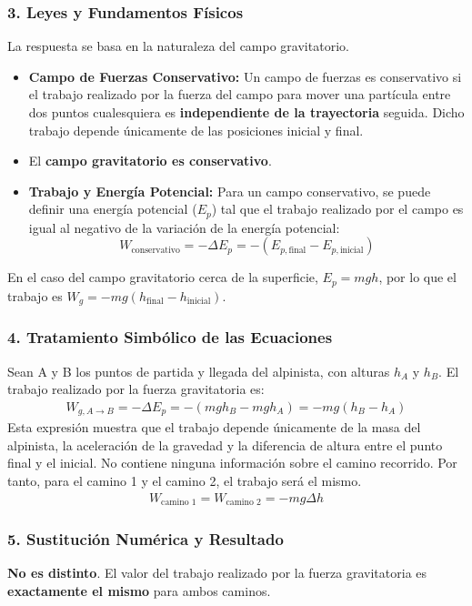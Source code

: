 \subsubsection*{3. Leyes y Fundamentos Físicos}
La respuesta se basa en la naturaleza del campo gravitatorio.
\begin{itemize}
    \item \textbf{Campo de Fuerzas Conservativo:} Un campo de fuerzas es conservativo si el trabajo realizado por la fuerza del campo para mover una partícula entre dos puntos cualesquiera es \textbf{independiente de la trayectoria} seguida. Dicho trabajo depende únicamente de las posiciones inicial y final.
    \item El \textbf{campo gravitatorio es conservativo}.
    \item \textbf{Trabajo y Energía Potencial:} Para un campo conservativo, se puede definir una energía potencial ($E_p$) tal que el trabajo realizado por el campo es igual al negativo de la variación de la energía potencial:
    $$ W_{\text{conservativo}} = -\Delta E_p = -(E_{p, \text{final}} - E_{p, \text{inicial}}) $$
\end{itemize}
En el caso del campo gravitatorio cerca de la superficie, $E_p = mgh$, por lo que el trabajo es $W_g = -mg(h_{\text{final}} - h_{\text{inicial}})$.

\subsubsection*{4. Tratamiento Simbólico de las Ecuaciones}
Sean A y B los puntos de partida y llegada del alpinista, con alturas $h_A$ y $h_B$. El trabajo realizado por la fuerza gravitatoria es:
\begin{gather}
    W_{g, A \to B} = - \Delta E_p = - (mgh_B - mgh_A) = -mg(h_B - h_A)
\end{gather}
Esta expresión muestra que el trabajo depende únicamente de la masa del alpinista, la aceleración de la gravedad y la diferencia de altura entre el punto final y el inicial. No contiene ninguna información sobre el camino recorrido. Por tanto, para el camino 1 y el camino 2, el trabajo será el mismo.
\begin{gather}
    W_{\text{camino 1}} = W_{\text{camino 2}} = -mg\Delta h
\end{gather}

\subsubsection*{5. Sustitución Numérica y Resultado}
\begin{cajaresultado}
\textbf{No es distinto}. El valor del trabajo realizado por la fuerza gravitatoria es \textbf{exactamente el mismo} para ambos caminos.
\end{cajaresultado}

